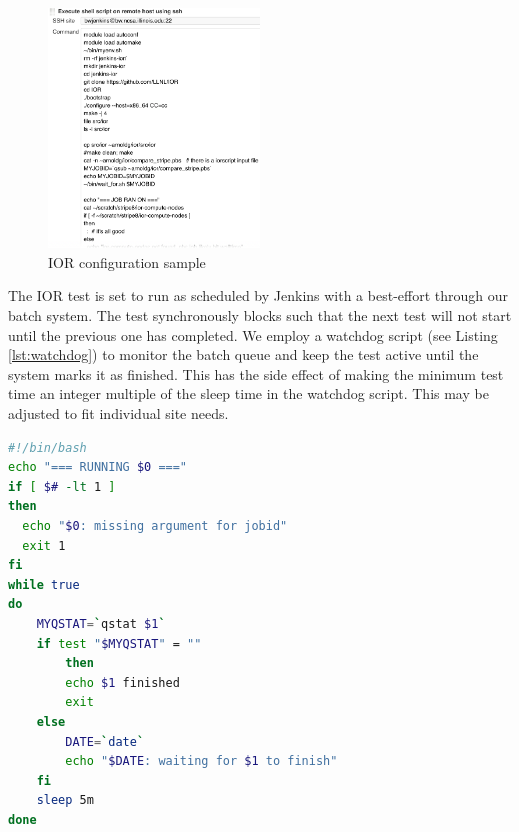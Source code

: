 \documentclass[10pt, conference, compsocconf]{IEEEtran}
\begin{document}
\begin{figure}[H]
\centering
\includegraphics[width=0.5\textwidth]{IOR-configuration-sample}
\caption{ IOR configuration sample }
\label{fig:IOR-configuration-sample}
\end{figure}
The IOR test is set to run as scheduled by Jenkins with a best-effort through our batch system.
The test synchronously blocks such that the next test will not start until the previous one has completed.
We employ a watchdog script (see Listing \ref{lst:watchdog}) to monitor the batch queue and keep the test active until the system marks it as finished.
This has the side effect of making the minimum test time an integer multiple of the sleep time in the watchdog script.
This may be adjusted to fit individual site needs.
\begin{lstlisting}[frame=tb,captionpos=t,language=bash,caption={pbs/torque watchdog script}, label=lst:watchdog]
#!/bin/bash
echo "=== RUNNING $0 ==="
if [ $# -lt 1 ]
then
  echo "$0: missing argument for jobid"
  exit 1
fi
while true
do
	MYQSTAT=`qstat $1`
	if test "$MYQSTAT" = ""
        then
		echo $1 finished
		exit
	else
		DATE=`date`
		echo "$DATE: waiting for $1 to finish"
	fi
	sleep 5m
done
\end{lstlisting}
\end{document}
